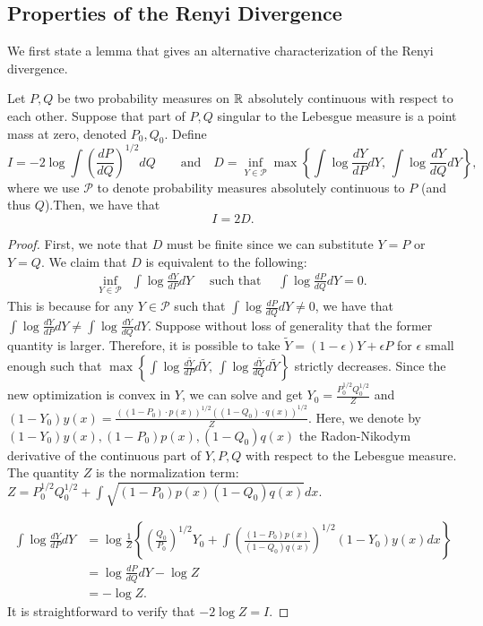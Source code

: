 \documentclass{article}
\begin{document}
\subsection*{Properties of the Renyi Divergence}




We first state a lemma that gives an alternative characterization of the Renyi divergence. 

\begin{lemma}
\label{lem:information_equivalence}

Let $P, Q$ be two probability measures on ${\mathbb R}$ absolutely continuous with respect to each other. Suppose that part of $P,Q$ singular to the Lebesgue measure is a point mass at zero, denoted $P_0, Q_0$. Define
\[
I = - 2 \log \int \left( \frac{dP}{dQ} \right)^{1/2} dQ \qquad  \text{and} \quad
D = \inf_{Y \in \mathcal{P}} \max \left\{ \int \log \frac{dY}{dP} dY, \, \int \log \frac{dY}{dQ} dY \right\},
\]
where we use $\mathcal{P}$ to denote probability measures absolutely continuous to $P$ (and thus $Q$).Then, we have that
\[ 
I = 2 D. 
\]
\end{lemma}


\begin{proof} 
First, we note that $D$ must be finite since we can substitute $Y = P$ or $Y= Q$. We claim that $D$ is equivalent to the following:
\begin{align*}
\inf_{Y \in \mathcal{P}} & \int \log \frac{dY}{dP} dY \quad \text{ such that } \quad \int \log \frac{dP}{dQ} dY = 0.
\end{align*}
This is because for any $Y \in \mathcal{P}$ such that $\int \log \frac{dP}{dQ} dY \neq 0$, 
we have that $\int \log \frac{dY}{dP} dY \neq \int \log \frac{dY}{dQ} dY$. 
Suppose without loss of generality that the former quantity is larger.  Therefore, it is possible to take $\tilde{Y} = (1 - \epsilon) Y + \epsilon P$ for $\epsilon$ small enough such that $ \max \left\{ \int \log \frac{d\tilde{Y}}{dP} d\tilde{Y}, \, \int \log \frac{d\tilde{Y}}{dQ} d\tilde{Y} \right\}$ strictly decreases. Since the new optimization is convex in $Y$, we can solve and get $Y_0 = \frac{P_0^{1/2} Q_0^{1/2}}{Z}$ and $(1-Y_0) y(x) = \frac{((1-P_0) \cdot p(x))^{1/2} ((1-Q_0) \cdot q(x))^{1/2}}{Z}$. Here, we denote by $(1-Y_0) y(x), (1-P_0)p(x), (1-Q_0)q(x)$ the Radon-Nikodym derivative of the continuous part of $Y, P, Q$ with respect to the Lebesgue measure. The quantity $Z$ is the normalization term: $Z = P_0^{1/2} Q_0^{1/2} + \int \sqrt{ (1-P_0) p(x) (1-Q_0) q(x)} dx$. 

\begin{align*}
\int \log \frac{dY}{dP} dY  &= \log \frac{1}{Z} \left\{ 
           \left( \frac{Q_0}{P_0} \right)^{1/2}  Y_0 + \int \left(\frac{(1-P_0) p(x)}{(1-Q_0)q(x)} \right)^{1/2} (1-Y_0) y(x) dx \right\} \\
  &= \log \frac{dP}{dQ} dY - \log Z \\
  &= - \log Z. 
\end{align*}
It is straightforward to verify that $-2 \log Z = I$. 
\end{proof}
\end{document}
